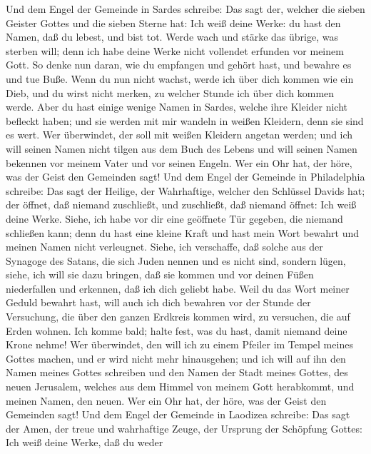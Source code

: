  Und dem Engel der Gemeinde in Sardes schreibe: Das sagt
der, welcher die sieben Geister Gottes und die sieben Sterne hat: Ich
weiß deine Werke: du hast den Namen, daß du lebest, und bist tot.
 Werde wach und stärke das übrige, was sterben will; denn
ich habe deine Werke nicht vollendet erfunden vor meinem Gott.
 So denke nun daran, wie du empfangen und gehört hast, und
bewahre es und tue Buße. Wenn du nun nicht wachst, werde ich über dich
kommen wie ein Dieb, und du wirst nicht merken, zu welcher Stunde ich
über dich kommen werde.  Aber du hast einige wenige Namen
in Sardes, welche ihre Kleider nicht befleckt haben; und sie werden mit
mir wandeln in weißen Kleidern, denn sie sind es wert. 
Wer überwindet, der soll mit weißen Kleidern angetan werden; und ich
will seinen Namen nicht tilgen aus dem Buch des Lebens und will seinen
Namen bekennen vor meinem Vater und vor seinen Engeln. 
Wer ein Ohr hat, der höre, was der Geist den Gemeinden sagt!
 Und dem Engel der Gemeinde in Philadelphia schreibe: Das
sagt der Heilige, der Wahrhaftige, welcher den Schlüssel Davids hat; der
öffnet, daß niemand zuschließt, und zuschließt, daß niemand öffnet:
 Ich weiß deine Werke. Siehe, ich habe vor dir eine
geöffnete Tür gegeben, die niemand schließen kann; denn du hast eine
kleine Kraft und hast mein Wort bewahrt und meinen Namen nicht
verleugnet.  Siehe, ich verschaffe, daß solche aus der
Synagoge des Satans, die sich Juden nennen und es nicht sind, sondern
lügen, siehe, ich will sie dazu bringen, daß sie kommen und vor deinen
Füßen niederfallen und erkennen, daß ich dich geliebt habe.
 Weil du das Wort meiner Geduld bewahrt hast, will auch
ich dich bewahren vor der Stunde der Versuchung, die über den ganzen
Erdkreis kommen wird, zu versuchen, die auf Erden wohnen.
 Ich komme bald; halte fest, was du hast, damit niemand
deine Krone nehme!  Wer überwindet, den will ich zu einem
Pfeiler im Tempel meines Gottes machen, und er wird nicht mehr
hinausgehen; und ich will auf ihn den Namen meines Gottes schreiben und
den Namen der Stadt meines Gottes, des neuen Jerusalem, welches aus dem
Himmel von meinem Gott herabkommt, und meinen Namen, den neuen.
 Wer ein Ohr hat, der höre, was der Geist den Gemeinden
sagt!  Und dem Engel der Gemeinde in Laodizea schreibe:
Das sagt der Amen, der treue und wahrhaftige Zeuge, der Ursprung der
Schöpfung Gottes:  Ich weiß deine Werke, daß du weder
